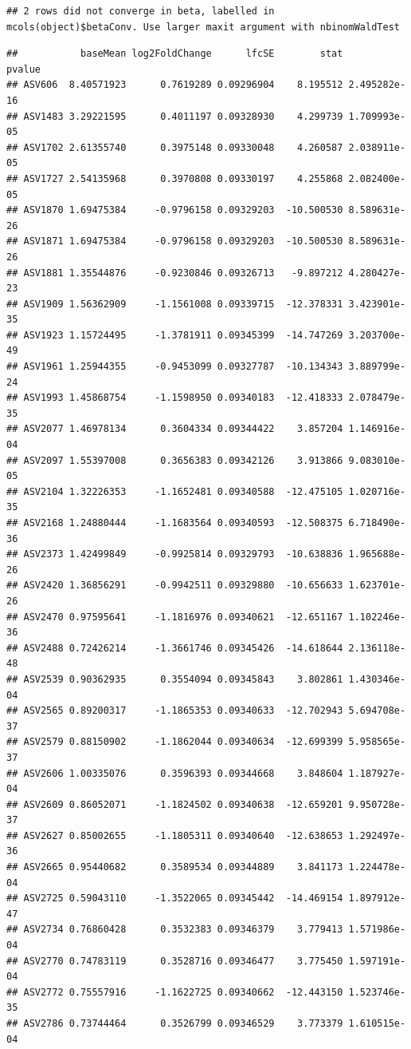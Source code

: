 \documentclass[]{article}
\begin{document}
\begin{verbatim}
## 2 rows did not converge in beta, labelled in mcols(object)$betaConv. Use larger maxit argument with nbinomWaldTest
\end{verbatim}

\begin{verbatim}
##           baseMean log2FoldChange      lfcSE        stat       pvalue
## ASV606  8.40571923      0.7619289 0.09296904    8.195512 2.495282e-16
## ASV1483 3.29221595      0.4011197 0.09328930    4.299739 1.709993e-05
## ASV1702 2.61355740      0.3975148 0.09330048    4.260587 2.038911e-05
## ASV1727 2.54135968      0.3970808 0.09330197    4.255868 2.082400e-05
## ASV1870 1.69475384     -0.9796158 0.09329203  -10.500530 8.589631e-26
## ASV1871 1.69475384     -0.9796158 0.09329203  -10.500530 8.589631e-26
## ASV1881 1.35544876     -0.9230846 0.09326713   -9.897212 4.280427e-23
## ASV1909 1.56362909     -1.1561008 0.09339715  -12.378331 3.423901e-35
## ASV1923 1.15724495     -1.3781911 0.09345399  -14.747269 3.203700e-49
## ASV1961 1.25944355     -0.9453099 0.09327787  -10.134343 3.889799e-24
## ASV1993 1.45868754     -1.1598950 0.09340183  -12.418333 2.078479e-35
## ASV2077 1.46978134      0.3604334 0.09344422    3.857204 1.146916e-04
## ASV2097 1.55397008      0.3656383 0.09342126    3.913866 9.083010e-05
## ASV2104 1.32226353     -1.1652481 0.09340588  -12.475105 1.020716e-35
## ASV2168 1.24880444     -1.1683564 0.09340593  -12.508375 6.718490e-36
## ASV2373 1.42499849     -0.9925814 0.09329793  -10.638836 1.965688e-26
## ASV2420 1.36856291     -0.9942511 0.09329880  -10.656633 1.623701e-26
## ASV2470 0.97595641     -1.1816976 0.09340621  -12.651167 1.102246e-36
## ASV2488 0.72426214     -1.3661746 0.09345426  -14.618644 2.136118e-48
## ASV2539 0.90362935      0.3554094 0.09345843    3.802861 1.430346e-04
## ASV2565 0.89200317     -1.1865353 0.09340633  -12.702943 5.694708e-37
## ASV2579 0.88150902     -1.1862044 0.09340634  -12.699399 5.958565e-37
## ASV2606 1.00335076      0.3596393 0.09344668    3.848604 1.187927e-04
## ASV2609 0.86052071     -1.1824502 0.09340638  -12.659201 9.950728e-37
## ASV2627 0.85002655     -1.1805311 0.09340640  -12.638653 1.292497e-36
## ASV2665 0.95440682      0.3589534 0.09344889    3.841173 1.224478e-04
## ASV2725 0.59043110     -1.3522065 0.09345442  -14.469154 1.897912e-47
## ASV2734 0.76860428      0.3532383 0.09346379    3.779413 1.571986e-04
## ASV2770 0.74783119      0.3528716 0.09346477    3.775450 1.597191e-04
## ASV2772 0.75557916     -1.1622725 0.09340662  -12.443150 1.523746e-35
## ASV2786 0.73744464      0.3526799 0.09346529    3.773379 1.610515e-04

\end{verbatim}
\end{document}
